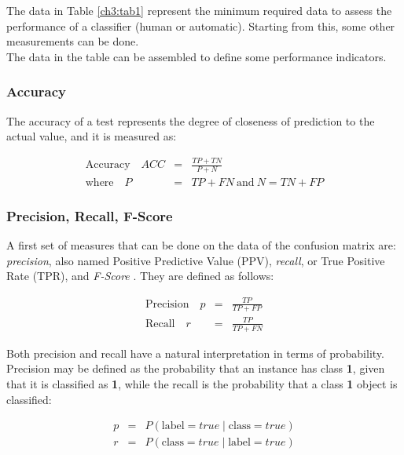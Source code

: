 The data in Table \ref{ch3:tab1} represent the minimum required data to assess the performance of a classifier (human or automatic).
Starting from this, some other measurements can be done.\\
The data in the table can be assembled to define some performance indicators.

\vspace{0.5cm}

\subsubsection{Accuracy}

The accuracy of a test represents the degree of closeness of prediction to the actual value, and it is measured as:

\begin{eqnarray}
 \textrm{Accuracy} \quad ACC & = & \frac{TP+TN}{P+N} \\
 \textrm{where} \quad P & = & TP + FN \ \textrm{and} \ N = TN + FP
\end{eqnarray}


\vspace{0.5cm}

\subsubsection{Precision, Recall, F-Score}

A first set of measures that can be done on the data of the confusion matrix are: \textit{precision}, also named Positive Predictive Value (PPV),
\textit{recall}, or True Positive Rate (TPR), and \textit{F-Score} \cite{Precision_Recall_Fscore}.
They are defined as follows:

\begin{eqnarray}
 \textrm{Precision} \quad p & = & \frac{TP}{TP+FP} \\
 \textrm{Recall} \quad r & = &   \frac{TP}{TP+FN}
\end{eqnarray}

Both precision and recall have a natural interpretation in terms of probability. Precision may be defined as the probability that an instance
has class \textbf{1}, given that it is classified as \textbf{1}, while the recall is the probability that a class \textbf{1} object is classified:

\begin{eqnarray}
 p & = & P(\textrm{label} = true \mid \textrm{class} = true ) \\
 r & = & P(\textrm{class} = true \mid \textrm{label} = true )
\end{eqnarray}

